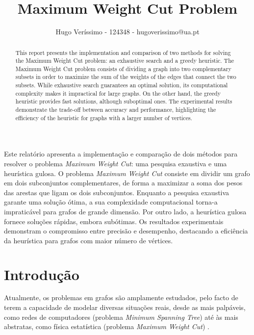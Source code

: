 \documentclass[mirror]{revdetua}
\begin{document}

\title{Maximum Weight Cut Problem}
\author{Hugo Veríssimo - 124348 - hugoverissimo@ua.pt}
\maketitle

\begin{abstract}
This report presents the implementation and comparison of two methods for solving the Maximum Weight Cut problem: an exhaustive search and a greedy heuristic. The Maximum Weight Cut problem consists of dividing a graph into two complementary subsets in order to maximize the sum of the weights of the edges that connect the two subsets. While exhaustive search guarantees an optimal solution, its computational complexity makes it impractical for large graphs. On the other hand, the greedy heuristic provides fast solutions, although suboptimal ones. The experimental results demonstrate the trade-off between accuracy and performance, highlighting the efficiency of the heuristic for graphs with a larger number of vertices.
\end{abstract}

\begin{resumo}
Este relatório apresenta a implementação e comparação de dois métodos para resolver o problema \textit{Maximum Weight Cut}: uma pesquisa exaustiva e uma heurística gulosa. O problema \textit{Maximum Weight Cut} consiste em dividir um grafo em dois subconjuntos complementares, de forma a maximizar a soma dos pesos das arestas que ligam os dois subconjuntos. Enquanto a pesquisa exaustiva garante uma solução ótima, a sua complexidade computacional torna-a impraticável para grafos de grande dimensão. Por outro lado, a heurística gulosa fornece soluções rápidas, embora subótimas. Os resultados experimentais demonstram o compromisso entre precisão e desempenho, destacando a eficiência da heurística para grafos com maior número de vértices.
\end{resumo}

\section{Introdução}

Atualmente, os problemas em grafos são amplamente estudados, pelo facto de terem a capacidade de modelar diversas situações reais, desde as mais palpáveis, como redes de computadores (problema \textit{Minimum Spanning Tree}) até às mais abstratas, como física estatística (problema \textit{Maximum Weight Cut}) \cite{WANG10}.
\end{document}
